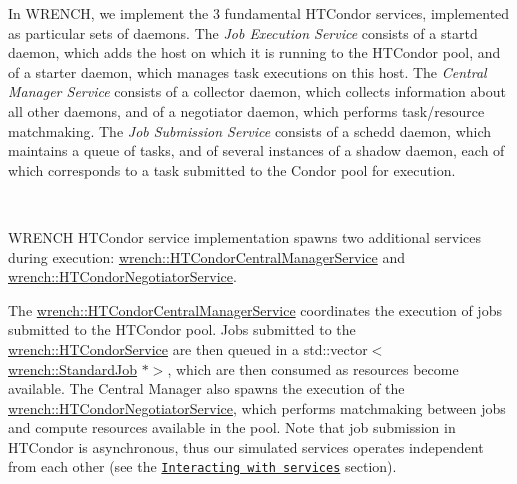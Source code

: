 In W\+R\+E\+N\+CH, we implement the 3 fundamental H\+T\+Condor services, implemented as particular sets of daemons. The {\itshape Job Execution Service} consists of a {\ttfamily startd} daemon, which adds the host on which it is running to the H\+T\+Condor pool, and of a {\ttfamily starter} daemon, which manages task executions on this host. The {\itshape Central Manager Service} consists of a {\ttfamily collector} daemon, which collects information about all other daemons, and of a {\ttfamily negotiator} daemon, which performs task/resource matchmaking. The {\itshape Job Submission Service} consists of a {\ttfamily schedd} daemon, which maintains a queue of tasks, and of several instances of a {\ttfamily shadow} daemon, each of which corresponds to a task submitted to the Condor pool for execution.



~

W\+R\+E\+N\+CH H\+T\+Condor service implementation spawns two additional services during execution\+: \hyperlink{classwrench_1_1_h_t_condor_central_manager_service}{wrench\+::\+H\+T\+Condor\+Central\+Manager\+Service} and \hyperlink{classwrench_1_1_h_t_condor_negotiator_service}{wrench\+::\+H\+T\+Condor\+Negotiator\+Service}.

The \hyperlink{classwrench_1_1_h_t_condor_central_manager_service}{wrench\+::\+H\+T\+Condor\+Central\+Manager\+Service} coordinates the execution of jobs submitted to the H\+T\+Condor pool. Jobs submitted to the \hyperlink{classwrench_1_1_h_t_condor_service}{wrench\+::\+H\+T\+Condor\+Service} are then queued in a {\ttfamily std\+::vector$<$\hyperlink{classwrench_1_1_standard_job}{wrench\+::\+Standard\+Job} $\ast$$>$}, which are then consumed as resources become available. The Central Manager also spawns the execution of the \hyperlink{classwrench_1_1_h_t_condor_negotiator_service}{wrench\+::\+H\+T\+Condor\+Negotiator\+Service}, which performs matchmaking between jobs and compute resources available in the pool. Note that job submission in H\+T\+Condor is asynchronous, thus our simulated services operates independent from each other (see the \href{#wrench-101-WMS-services}{\tt Interacting with services} section). 